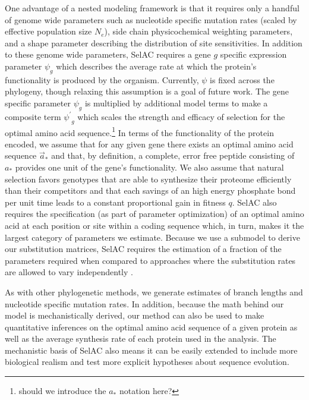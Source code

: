 \documentclass{article}
\newcommand{\Ne}{\ensuremath{{N_e}}\xspace} %
\newcommand{\selac}{SelAC\xspace}
\newcommand{\aopt}{\ensuremath{a_*}\xspace}
\newcommand{\aoptvec}{\ensuremath{\Vec{a}_*}\xspace}
\newcommand{\psiprime}{\ensuremath{\psi^\prime}\xspace}
\begin{document}
One advantage of a nested modeling framework is that it requires only a handful of genome wide parameters such as nucleotide specific mutation rates (scaled by effective population size \Ne), side chain physicochemical weighting parameters, and a shape parameter describing the distribution of site sensitivities. %
In addition to these genome wide parameters, \selac requires a gene $g$ specific expression parameter $\psi_g$ which describes the average rate at which the protein's functionality is produced by the organism.
Currently, $\psi$ is fixed across the phylogeny, though relaxing this assumption is a goal of future work.
The gene specific parameter $\psi_g$ is multiplied by additional model terms to make a composite term $\psiprime_g$ which scales the strength and efficacy of selection for the optimal amino acid sequence.\footnote{should we introduce the \aopt notation here?}
In terms of the functionality of the protein encoded, we assume that for any given gene there exists an optimal amino acid sequence \aoptvec and that, by definition, a complete, error free peptide consisting of \aopt provides one unit of the gene's functionality.
We also assume that natural selection favors genotypes that are able to synthesize their proteome efficiently than their competitors and that each savings of an high energy phosphate bond per unit time leads to a constant proportional gain in fitness $q$.
\selac also requires the specification (as part of parameter optimization) of an optimal amino acid at each position or site within a coding sequence which, in turn, makes it the largest category of parameters we estimate.
Because we use a submodel to derive our substitution matrices, \selac requires the estimation of a fraction of the parameters required when compared to approaches where the substitution rates are allowed to vary independently \citep{HalpernAndBruno1998,LartillotAndPhilippe2004,RodrigueAndLartillot2014}.

As with other phylogenetic methods, we generate estimates of branch lengths and nucleotide specific mutation rates.
In addition, because the math behind our model is mechanistically derived, our method can also be used to make quantitative inferences on the optimal amino acid sequence of a given protein as well as the average synthesis rate of each protein used in the analysis.
The mechanistic basis of \selac also means it can be easily extended to include more biological realism and test more explicit hypotheses about sequence evolution.
\end{document}
